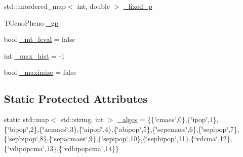 \begin{DoxyCompactItemize}
std\-::unordered\-\_\-map$<$ int, double $>$ \hyperlink{classlibcmaes_1_1Parameters_a83fdae9d4bb9b77c8ad955c6aac75086}{\-\_\-fixed\-\_\-p}
\item 
T\-Geno\-Pheno \hyperlink{classlibcmaes_1_1Parameters_ab8e153b4785de9358599caa840b94ef2}{\-\_\-gp}
\item 
bool \hyperlink{classlibcmaes_1_1Parameters_a78a3b97b4119776b661c1be4fc283069}{\-\_\-mt\-\_\-feval} = false
\item 
int \hyperlink{classlibcmaes_1_1Parameters_a6ecc091e7e10b30c067f28e5be05faff}{\-\_\-max\-\_\-hist} = -\/1
\item 
bool \hyperlink{classlibcmaes_1_1Parameters_a8c65760fc2d97303d9881c2a945d1d7b}{\-\_\-maximize} = false
\end{DoxyCompactItemize}
\subsection*{Static Protected Attributes}
\begin{DoxyCompactItemize}
\item 
static std\-::map$<$ std\-::string, int $>$ \hyperlink{classlibcmaes_1_1Parameters_a5d2fd0ca871efd0f4f4b223515544204}{\-\_\-algos} = \{\{\char`\"{}cmaes\char`\"{},0\},\{\char`\"{}ipop\char`\"{},1\},\{\char`\"{}bipop\char`\"{},2\},\{\char`\"{}acmaes\char`\"{},3\},\{\char`\"{}aipop\char`\"{},4\},\{\char`\"{}abipop\char`\"{},5\},\{\char`\"{}sepcmaes\char`\"{},6\},\{\char`\"{}sepipop\char`\"{},7\},\{\char`\"{}sepbipop\char`\"{},8\},\{\char`\"{}sepacmaes\char`\"{},9\},\{\char`\"{}sepipop\char`\"{},10\},\{\char`\"{}sepbipop\char`\"{},11\},\{\char`\"{}vdcma\char`\"{},12\},\{\char`\"{}vdipopcma\char`\"{},13\},\{\char`\"{}vdbipopcma\char`\"{},14\}\}
\end{DoxyCompactItemize}
